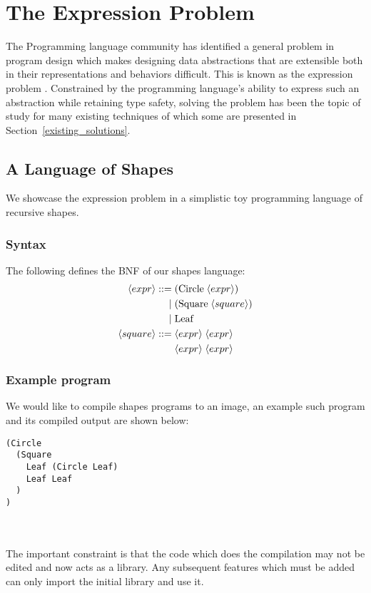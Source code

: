 \chapter{The Expression Problem}
\label{expression-problem}
\thispagestyle{myheadings}

The Programming language community has identified a general problem in program design which makes designing data abstractions that are extensible both in their representations and behaviors difficult. This is known as the expression problem \cite{expression_problem}. Constrained by the programming language's ability to express such an abstraction while retaining type safety, solving the problem has been the topic of study for many existing techniques of which some are presented in Section~\ref{existing_solutions}.

\section{A Language of Shapes}
We showcase the expression problem in a simplistic toy programming language of recursive shapes.
\subsection{Syntax}
The following defines the BNF of our shapes language:
\begin{align*}
    \key{expr}  ::=& \; (\text{Circle}\;\key{expr}) \\
                |& \; (\text{Square}\;\key{square}) \\
                |& \; \text{Leaf} \\
    \key{square} ::=&\; \vtop{\hbox{$\key{expr} \; \key{expr}$}\hbox{$\key{expr} \; \key{expr}$}}\\
\end{align*}

\subsection{Example program}
We would like to compile shapes programs to an image, an example such program and its compiled output are shown below: \\

\begin{minipage}[]{0.5\linewidth}
    \begin{verbatim}
(Circle
  (Square
    Leaf (Circle Leaf)
    Leaf Leaf
  )
)
    \end{verbatim}
\end{minipage}
\begin{minipage}[]{0.5\linewidth}
        
\end{minipage}
\\\\
The important constraint is that the code which does the compilation may not be edited and now acts as a library. Any subsequent features which must be added can only import the initial library and use it.

